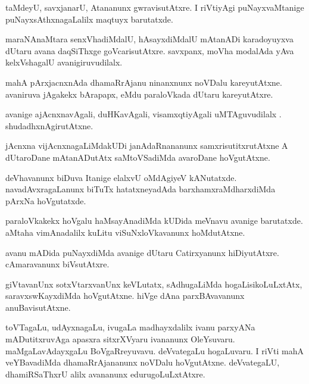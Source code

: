 \documentclass{article}
\begin{document}
\begin{mn}
taMdeyU, savxjanarU, Atananunx gwravisutAtxre.  I riVtiyAgi puNayxvaMtanige 
 puNayxsAthxnagaLalilx maqtuyx barutatxde.
\end{mn}

\begin{mn}
maraNAnaMtara  senxVhadiMdalU,  hAsayxdiMdalU mAtanADi karadoyuyxva dUtaru avana daqSiThxge
goVcarisutAtxre.  savxpanx,  moVha modalAda yAva kelxVshagalU avanigiruvudilalx.
\end{mn}

\begin{mn}
mahA pArxjacnxnAda dhamaRrAjanu ninanxnunx  noVDalu kareyutAtxne.  avaniruva 
jAgakekx bArapapx, eMdu paraloVkada dUtaru kareyutAtxre. 
\end{mn}

\begin{mn}
avanige ajAcnxnavAgali, duHKavAgali, visamxqtiyAgali uMTAguvudilalx .  shudadhxnAgirutAtxne.
\end{mn}

\begin{mn}
jAcnxna vijAcnxnagaLiMdakUDi  janAdaRnananunx samxrisutitxrutAtxne  A dUtaroDane 
mAtanADutAtx saMtoVSadiMda avaroDane hoVgutAtxne.
\end{mn}

\begin{mn}
deVhavanunx biDuva Itanige elalxvU oMdAgiyeV  kANutatxde. navadAvxragaLanunx 
biTuTx hatatxneyadAda barxhamxraMdharxdiMda pArxNa  hoVgutatxde.
\end{mn}

\begin{mn}
paraloVkakekx hoVgalu haMsayAnadiMda kUDida meVnavu avanige barutatxde.  
aMtaha vimAnadalilx kuLitu viSuNxloVkavanunx hoMdutAtxne.    
\end{mn}

\begin{mn}
avanu mADida puNayxdiMda avanige dUtaru Catirxyanunx hiDiyutAtxre.  cAmaravanunx biVsutAtxre.
\end{mn}

\begin{mn}
giVtavanUnx  sotxVtarxvanUnx  keVLutatx, sAdhugaLiMda hogaLisikoLuLxtAtx,  
saravxswKayxdiMda  hoVgutAtxne.  hiVge dAna parxBAvavanunx anuBavisutAtxne. 
\end{mn}

\begin{mn}
toVTagaLu, udAyxnagaLu,  ivugaLa madhayxdalilx ivanu parxyANa mADutitxruvAga 
apasxra sitxrXVyaru ivananunx OleYsuvaru.  maMgaLavAdayxgaLu BoVgaRreyuvavu.  
deVvategaLu hogaLuvaru.  I riVti mahA veYBavadiMda  dhamaRrAjananunx noVDalu 
hoVgutAtxne. deVvategaLU, dhamiRSaThxrU alilx avananunx edurugoLuLxtAtxre.    
\end{mn}
\end{document}
